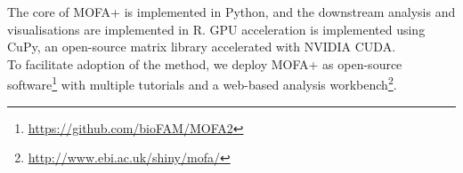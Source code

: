 The core of MOFA+ is implemented in Python, and the downstream analysis and visualisations are implemented in R. GPU acceleration is implemented using CuPy\cite{Okuta2017}, an open-source matrix library accelerated with NVIDIA CUDA.\\
To facilitate adoption of the method, we deploy MOFA+ as open-source software\footnote{\url{https://github.com/bioFAM/MOFA2}} with multiple tutorials and a web-based analysis workbench\footnote{\url{http://www.ebi.ac.uk/shiny/mofa/}}.%



